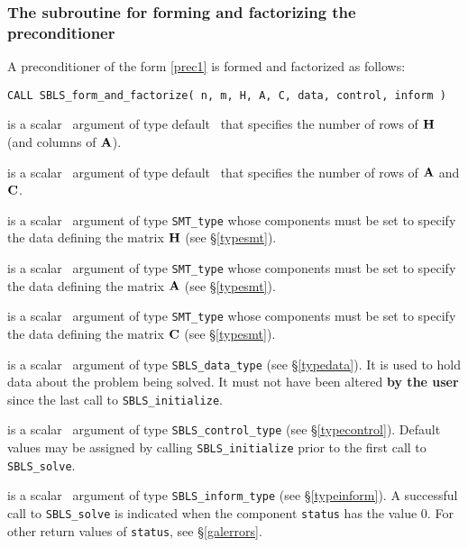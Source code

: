 \documentclass{galahad}
\newcommand{\packagename}{SBLS}
\begin{document}

\subsubsection{The subroutine for forming and factorizing the preconditioner}
A preconditioner of the form \ref{prec1} is formed and factorized as follows:
\vspace*{1mm}

\hspace{8mm}
{\tt CALL \packagename\_form\_and\_factorize( n, m, H, A, C, data, control, inform )}

\begin{description}
 is a scalar \intentin\ argument of type default \integer\ that specifies
the number of rows of ${\mathbf{H}}$ (and columns of ${\mathbf{A}}$).

 is a scalar \intentin\ argument of type default \integer\ that specifies
the number of rows of ${\mathbf{A}}$ and ${\mathbf{C}}$.

 is a scalar \intentin\ argument of type {\tt SMT\_type} whose
components must be set to specify the data defining the matrix ${\mathbf{H}}$
(see \S\ref{typesmt}).

 is a scalar \intentin\ argument of type {\tt SMT\_type} whose
components must be set to specify the data defining the matrix ${\mathbf{A}}$
(see \S\ref{typesmt}).

 is a scalar \intentin\ argument of type {\tt SMT\_type} whose
components must be set to specify the data defining the matrix ${\mathbf{C}}$
(see \S\ref{typesmt}).

 is a scalar \intentinout\ argument of type
{\tt \packagename\_data\_type}
(see \S\ref{typedata}). It is used to hold data about the problem being
solved. It must not have been altered {\bf by the user} since the last call to
{\tt \packagename\_initialize}.

 is a scalar \intentin\ argument of type
{\tt \packagename\_control\_type}
(see \S\ref{typecontrol}). Default values may be assigned by calling
{\tt \packagename\_initialize} prior to the first call to
{\tt \packagename\_solve}.

 is a scalar \intentout\ argument of type
{\tt \packagename\_inform\_type}
(see \S\ref{typeinform}). A successful call to
{\tt \packagename\_solve}
is indicated when the  component {\tt status} has the value 0.
For other return values of {\tt status}, see \S\ref{galerrors}.

\end{description}
\end{document}
